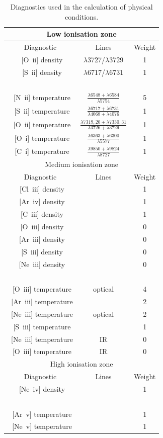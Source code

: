\documentclass[useAMS,usenatbib]{mn2e}
\begin{document}
\begin{table}
\begin{tabular}{ccc}
\hline
\multicolumn{3}{c}{Low ionisation zone}\\
\hline
Diagnostic & Lines & Weight \\
~[O~{\sc ii}] density & $\lambda$3727/$\lambda$3729 & 1 \\
~[S~{\sc ii}] density & $\lambda$6717/$\lambda$6731 & 1 \\
~\\
~[N~{\sc ii}] temperature & $\frac{\lambda 6548 + \lambda 6584}{\lambda 5754}$ & 5 \\
~[S~{\sc ii}] temperature & $\frac{\lambda 6717 + \lambda 6731}{\lambda 4068 +  \lambda 4076}$ & 1 \\
~[O~{\sc ii}] temperature & $\frac{\lambda 7319,20 + \lambda 7330,31}{\lambda 3726 + \lambda 3729}$ & 1 \\
~[O~{\sc i}] temperature & $\frac{\lambda 6363 + \lambda 6300}{\lambda 5577}$ & 1 \\
~[C~{\sc i}] temperature & $\frac{\lambda 9850 + \lambda 9824}{\lambda 8727}$ & 1 \\
\hline
\multicolumn{3}{c}{Medium ionisation zone}\\
\hline
Diagnostic & Lines & Weight \\
~[Cl~{\sc iii}] density & & 1 \\
~[Ar~{\sc iv}] density & & 1 \\
~[C~{\sc iii}] density & & 1 \\
~[O~{\sc iii}] density & & 0 \\
~[Ar~{\sc iii}] density & & 0 \\
~[S~{\sc iii}] density & & 0 \\
~[Ne~{\sc iii}] density & & 0 \\
~\\
~[O~{\sc iii}] temperature & optical & 4\\
~[Ar~{\sc iii}] temperature & & 2\\
~[Ne~{\sc iii}] temperature & optical & 2\\
~[S~{\sc iii}] temperature & & 1\\
~[Ne~{\sc iii}] temperature & IR & 0\\
~[O~{\sc iii}] temperature & IR & 0\\
\hline
\multicolumn{3}{c}{High ionisation zone}\\
\hline
Diagnostic & Lines & Weight \\
~[Ne~{\sc iv}] density & & 1 \\
~\\
~[Ar~{\sc v}] temperature & & 1 \\
~[Ne~{\sc v}] temperature & & 1 \\
\end{tabular}
\label{zonestable}
\caption{Diagnostics used in the calculation of physical conditions.}
\end{table}
\end{document}

